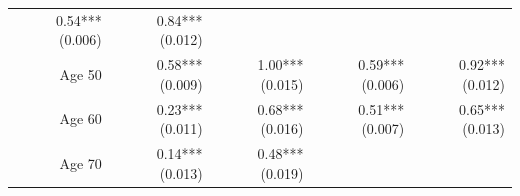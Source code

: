 \documentclass[]{article}
\begin{document}
\begin{longtable}[c]{@{}rrrrr@{}}
\begin{minipage}[t]{0.18\columnwidth}\raggedleft\strut
0.54*** (0.006)
\strut\end{minipage} &
\begin{minipage}[t]{0.15\columnwidth}\raggedleft\strut
0.84*** (0.012)
\strut\end{minipage}\tabularnewline
\begin{minipage}[t]{0.17\columnwidth}\raggedleft\strut
Age 50
\strut\end{minipage} &
\begin{minipage}[t]{0.20\columnwidth}\raggedleft\strut
0.58*** (0.009)
\strut\end{minipage} &
\begin{minipage}[t]{0.16\columnwidth}\raggedleft\strut
1.00*** (0.015)
\strut\end{minipage} &
\begin{minipage}[t]{0.18\columnwidth}\raggedleft\strut
0.59*** (0.006)
\strut\end{minipage} &
\begin{minipage}[t]{0.15\columnwidth}\raggedleft\strut
0.92*** (0.012)
\strut\end{minipage}\tabularnewline
\begin{minipage}[t]{0.17\columnwidth}\raggedleft\strut
Age 60
\strut\end{minipage} &
\begin{minipage}[t]{0.20\columnwidth}\raggedleft\strut
0.23*** (0.011)
\strut\end{minipage} &
\begin{minipage}[t]{0.16\columnwidth}\raggedleft\strut
0.68*** (0.016)
\strut\end{minipage} &
\begin{minipage}[t]{0.18\columnwidth}\raggedleft\strut
0.51*** (0.007)
\strut\end{minipage} &
\begin{minipage}[t]{0.15\columnwidth}\raggedleft\strut
0.65*** (0.013)
\strut\end{minipage}\tabularnewline
\begin{minipage}[t]{0.17\columnwidth}\raggedleft\strut
Age 70
\strut\end{minipage} &
\begin{minipage}[t]{0.20\columnwidth}\raggedleft\strut
0.14*** (0.013)
\strut\end{minipage} &
\begin{minipage}[t]{0.16\columnwidth}\raggedleft\strut
0.48*** (0.019)
\strut\end{minipage} &

\end{longtable}
\end{document}
